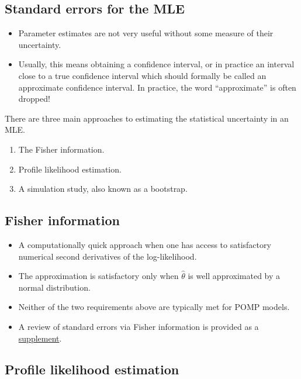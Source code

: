 \documentclass[
  letterpaper,
  DIV=11,
  numbers=noendperiod]{scrartcl}
\providecommand{\tightlist}{%
  \setlength{\itemsep}{0pt}\setlength{\parskip}{0pt}}\usepackage{longtable,booktabs,array}
\begin{document}
\hypertarget{standard-errors-for-the-mle}{%
\subsection{Standard errors for the
MLE}\label{standard-errors-for-the-mle}}

\begin{itemize}
\tightlist
\item
  Parameter estimates are not very useful without some measure of their
  uncertainty.
\item
  Usually, this means obtaining a confidence interval, or in practice an
  interval close to a true confidence interval which should formally be
  called an approximate confidence interval. In practice, the word
  ``approximate'' is often dropped!
\end{itemize}

There are three main approaches to estimating the statistical
uncertainty in an MLE.

\begin{enumerate}
\def\labelenumi{\arabic{enumi}.}
\item
  The Fisher information.
\item
  Profile likelihood estimation.
\item
  A simulation study, also known as a bootstrap.
\end{enumerate}

\hypertarget{fisher-information}{%
\subsection{Fisher information}\label{fisher-information}}

\begin{itemize}
\tightlist
\item
  A computationally quick approach when one has access to satisfactory
  numerical second derivatives of the log-likelihood.
\item
  The approximation is satisfactory only when \(\hat\theta\) is well
  approximated by a normal distribution.
\item
  Neither of the two requirements above are typically met for POMP
  models.
\item
  A review of standard errors via Fisher information is provided as a
  \href{fisherSE.html}{supplement}.
\end{itemize}

\hypertarget{profile-likelihood-estimation}{%
\subsection{Profile likelihood
estimation}\label{profile-likelihood-estimation}}
\end{document}
